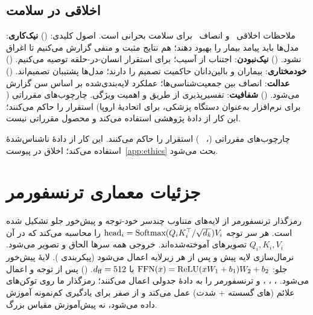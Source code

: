 \subsection{ اخلاقی در سلامت}

ملاحظات اخلاقی~\cite{floridi2018ai4people,jobin2019global,gerke2020ethical} و انصاف~\cite{obermeyer2019dissecting,chouldechova2017fairness,rajkomar2019ensuring} برای  سلامت بحرانی است. اصول کلیدی: () \textbf{نیک‌کاری}: مدل‌ها باید پیامد بیمار را بهبود دهند؛ هم نتایج مثبت و منفی گزارش می‌کنیم تا اغراق نشود. () \textbf{نیک‌نبودن}: اجتناب از آسیب؛ برای استقرار انسان-در-حلقه توصیه می‌کنیم. () \textbf{خودمختاری}: بیماران و بالین‌دانان حاکمیت تصمیم را دارند؛ مدل‌ها پشتیبان تصمیم‌اند. () \textbf{عدالت}: انصاف بین جمعیت‌شناسی‌ها؛ عملکرد لایه‌بندی‌شده بر اساس سن گزارش می‌شود. () \textbf{شفافیت}: تفسیرپذیری از طریق  و اهمیت ویژگی. چارچوب‌های مقرراتی ( برای نرم‌افزار به‌عنوان دستگاه پزشکی،  برای اتحادیۀ اروپا) استقرار را حاکم می‌کنند؛ این کار از دادۀ پژوهشی استفاده می‌کند و محصول مقرراتی نیست.

چارچوب‌های مقرراتی (، ~\cite{voigt2019eu}) استقرار را حاکم می‌کنند. این کار از دادۀ ناشناس‌شدۀ  استفاده می‌کند؛ اخلاق در پیوست~\ref{app:ethics} بحث می‌شود.

\section{جزئیات معماری ترنسفورمر}

رمزگذار ترنسفورمر از لایه‌های متناوب چندسر خود-توجه و پیش‌خور جلو تشکیل شده است. هر سر توجه $\text{head}_i = \text{Softmax}(Q_i K_i^\top / \sqrt{d_k}) V_i$ را محاسبه می‌کند که در آن $Q_i, K_i, V_i$ تصویرهای آموخته‌شده‌اند. خروجی همه سرها الحاق و تصویر می‌شود. نرمال‌سازی لایه پیش و پس از هر زیرلایه اعمال می‌شود (پیکربندی ). لایۀ پیش‌خور جلو: $\text{FFN}(x) = \text{ReLU}(xW_1 + b_1)W_2 + b_2$ با $d_{\text{ff}} = 512$.  () پس از توجه و  اعمال می‌شود. ، ، ، و  ترنسفورمر را به دادۀ جدولی اعمال می‌کنند؛ رمزگذار  ما روی توکن‌های علائم (های گسسته + شدت) عمل می‌کند و از صفر برای یادگیری کم‌نمونه آموزش داده می‌شود، نه پیش‌آموزش مقیاس بزرگ.

